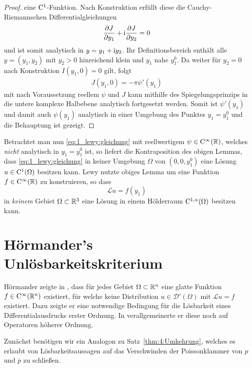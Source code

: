 \begin{proof}
eine $\mathrm C^1$-Funktion. Nach Konstruktion erfüllt diese die Cauchy-Riemannschen Differentialgleichungen
\begin{equation}
\frac{\partial J}{\partial y_1} +\mathrm i\frac{\partial J}{\partial y_2} = 0
\end{equation}
 und ist somit analytisch in $y=y_1+\mathrm i y_2$. Ihr Definitionsbereich enthält alle $y=(y_1,y_2)$ mit $y_2>0$ hinreichend klein und $y_1$ nahe $y_1^0$.
 Da weiter für $y_2=0$ nach Konstruktion $I(y_1,0)=0$ gilt, folgt
\begin{align*}
 J(y_1,0)=-\pi\psi'(y_1)
\end{align*}
mit nach Voraussetzung reellem $\psi$ und $J$ kann mithilfe des Spiegelungsprinzips in die untere komplexe Halbebene analytisch fortgesetzt werden. Somit ist $\psi'(y_1)$ 
und damit auch $\psi(y_1)$ analytisch in einer Umgebung des Punktes $y_1=y_1^0$ und die Behauptung ist gezeigt.
\end{proof}

Betrachtet man nun \eqref{eq:1_lewy:gleichung} mit reellwertigem $\psi\in \mathrm C^\infty(\mathbb R)$, welches \textit{nicht} analytisch in $y_1=y_1^0$ ist, so liefert die Kontraposition des obigen Lemmas, dass \eqref{eq:1_lewy:gleichung} in keiner Umgebung $\Omega$ von $(0,0,y_1^0)$ eine Lösung $u\in \mathrm C^1(\Omega)$ besitzen kann. Lewy nutzte obiges Lemma um eine Funktion $f\in\mathrm C^\infty(\mathbb R)$ zu konstruieren, so dass
\begin{equation} 
   \mathscr L u = f(y_1)
\end{equation}
in {\em keinem} Gebiet $\Omega\subset\mathbb R^3$ eine Lösung in einem Hölderraum $\mathrm C^{1,\alpha}(\Omega)$ besitzen kann.




\section{Hörmander's Unlösbarkeitskriterium}
Hörmander zeigte in \cite{Hormander:1960a}, dass für jedes Gebiet $\Omega\subset\mathbb R^n$ eine glatte Funktion $f\in\mathrm C^\infty(\mathbb R^n)$ existiert, für welche keine Distribution $u\in\mathscr{D}'(\Omega)$ mit $\mathscr Lu=f$ existiert. Dazu zeigte er eine notwendige Bedingung für die Lösbarkeit eines Differentialausdrucks erster Ordnung. In \cite{Hormander:1960b} verallgemeinerte er diese noch auf Operatoren höherer Ordnung.

Zunächst benötigen wir ein Analogon zu Satz~\ref{thm:4:Umkehrung}, welches es erlaubt von Lösbarkeitsaussagen auf das Verschwinden der Poissonklammer 
von $p$ und $\overline p$ zu schließen. 

